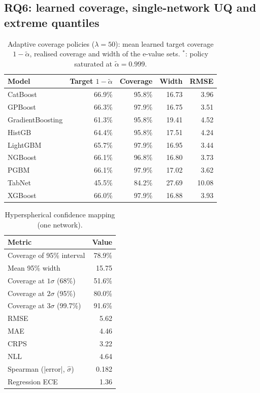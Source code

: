 \documentclass[11pt]{article}
\begin{document}
\subsection{RQ6: learned coverage, single-network UQ and extreme quantiles}
\begin{table}[t]\centering\small
\caption{Adaptive coverage policies ($\lambda=50$): mean learned target coverage $1-\tilde\alpha$, realised coverage and width of the e-value sets. $^\ast$: policy saturated at $\tilde\alpha=0.999$.}\label{tab:acp}
\begin{tabular}{lrrrr}\toprule Model & Target $1-\tilde\alpha$ & Coverage & Width & RMSE\\\midrule
CatBoost & 66.9\% & 95.8\% & 16.73 & 3.96\\
GPBoost & 66.3\% & 97.9\% & 16.75 & 3.51\\
GradientBoosting & 61.3\% & 95.8\% & 19.41 & 4.52\\
HistGB & 64.4\% & 95.8\% & 17.51 & 4.24\\
LightGBM & 65.7\% & 97.9\% & 16.95 & 3.44\\
NGBoost & 66.1\% & 96.8\% & 16.80 & 3.73\\
PGBM & 66.1\% & 97.9\% & 17.02 & 3.62\\
TabNet & 45.5\% & 84.2\% & 27.69 & 10.08\\
XGBoost & 66.0\% & 97.9\% & 16.88 & 3.93\\
\bottomrule\end{tabular}\end{table}
\begin{table}[t]\centering\small
\caption{Hyperspherical confidence mapping (one network).}\label{tab:hcm}
\begin{tabular}{lr}\toprule Metric & Value\\\midrule
Coverage of 95\% interval & 78.9\%\\
Mean 95\% width & 15.75\\
Coverage at $1\sigma$ (68\%) & 51.6\%\\
Coverage at $2\sigma$ (95\%) & 80.0\%\\
Coverage at $3\sigma$ (99.7\%) & 91.6\%\\
RMSE & 5.62\\
MAE & 4.46\\
CRPS & 3.22\\
NLL & 4.64\\
Spearman (|error|, $\hat\sigma$) & 0.182\\
Regression ECE & 1.36\\
\bottomrule\end{tabular}\end{table}
\end{document}
